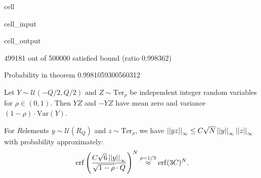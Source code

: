 \documentclass[letterpaper,10pt,english]{jupyterBook}
\begin{document}
\begin{sphinxuseclass}{cell}
\begin{sphinxVerbatimInput}
\begin{sphinxuseclass}{cell_input}
\end{sphinxuseclass}\end{sphinxVerbatimInput}
\begin{sphinxVerbatimOutput}

\begin{sphinxuseclass}{cell_output}
\begin{sphinxVerbatim}[commandchars=\\\{\}]
499181 out of 500000 satisfied bound (ratio 0.998362)
\end{sphinxVerbatim}

\begin{sphinxVerbatim}[commandchars=\\\{\}]
Probability in theorem 0.9981059300560312
\end{sphinxVerbatim}

\end{sphinxuseclass}\end{sphinxVerbatimOutput}

\end{sphinxuseclass}
\sphinxAtStartPar
Let \(Y \sim \mathcal U (-Q/2,Q/2)\) and \(Z \sim \mathrm{Ter}_\rho\) be independent integer random variables for \(\rho \in (0,1)\). Then \(YZ\) and \(-YZ\) have mean zero and variance \((1-\rho) \cdot \mathrm{Var}(Y)\).

\sphinxAtStartPar
For \(R\)\sphinxhyphen{}elements \(y \sim \mathcal U(R_Q)\) and \(z \sim \mathrm{Ter}_{\rho}\), we have \(\left\lvert\left\lvert yz \right\rvert\right\rvert_\infty \le C\sqrt{N}\left\lvert\left\lvert y \right\rvert\right\rvert_\infty\left\lvert\left\lvert z \right\rvert\right\rvert_\infty\) with probability approximately:
\begin{equation*}
\begin{split}\mathrm{erf}\left(\frac{C\sqrt{6}\left\lvert\left\lvert y \right\rvert\right\rvert_\infty}{\sqrt{1-\rho}\cdot Q}\right)^N \overset{\rho = 1/3}{\approx} \mathrm{erf}(3C)^N.\end{split}
\end{equation*}
\begin{DUlineblock}{0em}
\item[] 
\end{DUlineblock}
\end{document}
